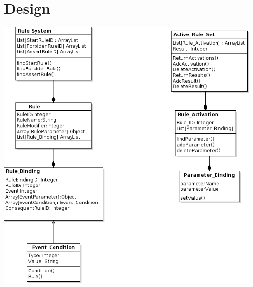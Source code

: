 \documentclass[a4paper]{article}
\begin{document}
\newpage

\section{Design}
\includegraphics[width=\textwidth,height=\textheight,keepaspectratio]{../Graphs/classes.png}
\end{document}
